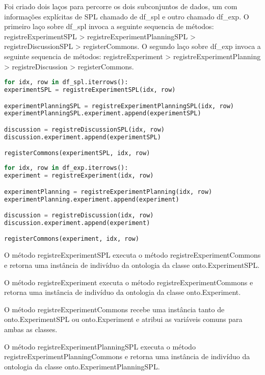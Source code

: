Foi criado dois laços para percorre os dois subconjuntos de dados, um com informações explícitas de SPL chamado de df\_spl  e outro chamado df\_exp. O primeiro laço sobre df\_spl invoca a seguinte sequencia de métodos: registreExperimentSPL > registreExperimentPlanningSPL > registreDiscussionSPL > registerCommons. O segundo laço sobre df\_exp invoca a seguinte sequencia de métodos: registreExperiment > registreExperimentPlanning > registreDiscussion > registerCommons.

\begin{lstlisting}[language=Python, caption=The first loop on \texttt{df\_spl}, label=lst:first-loop]
for idx, row in df_spl.iterrows():
experimentSPL = registreExperimentSPL(idx, row)

experimentPlanningSPL = registreExperimentPlanningSPL(idx, row)
experimentPlanningSPL.experiment.append(experimentSPL)

discussion = registreDiscussionSPL(idx, row)
discussion.experiment.append(experimentSPL)

registerCommons(experimentSPL, idx, row)
\end{lstlisting}

\begin{lstlisting}[language=Python, caption=The second loop on \texttt{df\_exp}, label=lst:second-loop]
for idx, row in df_exp.iterrows():
experiment = registreExperiment(idx, row)

experimentPlanning = registreExperimentPlanning(idx, row)
experimentPlanning.experiment.append(experiment)

discussion = registreDiscussion(idx, row)
discussion.experiment.append(experiment)

registerCommons(experiment, idx, row)
\end{lstlisting}

O método registreExperimentSPL executa o método registreExperimentCommons e retorna uma instância de indivíduo da ontologia da classe onto.ExperimentSPL.

O método registreExperiment executa o método registreExperimentCommons e retorna uma instância de indivíduo da ontologia da classe onto.Experiment.

O método registreExperimentCommons recebe uma instância tanto de onto.ExperimentSPL ou onto.Experiment e atribui as variáveis comuns para ambas as classes.

O método registreExperimentPlanningSPL executa o método registreExperimentPlanningCommons e retorna uma instância de indivíduo da ontologia da classe onto.ExperimentPlanningSPL.

